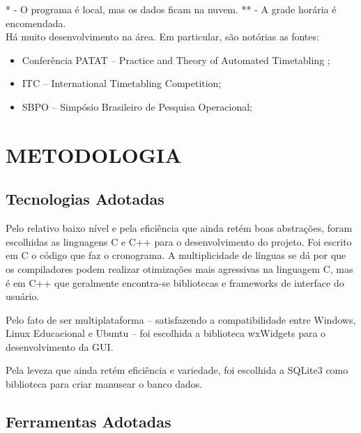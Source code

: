 \documentclass[12pt,a4paper]{article}
\begin{document}
		* - O programa é local, mas os dados ficam na nuvem.
		** - A grade horária é encomendada.
		\\

		Há muito desenvolvimento na área. Em particular, são notórias as fontes:

		\begin{itemize}
			\item Conferência PATAT -- Practice and Theory of Automated Timetabling ;
			\item ITC -- International Timetabling Competition;
			\item SBPO -- Simpósio Brasileiro de Pesquisa Operacional;
		\end{itemize}

	\clearpage

	\section{METODOLOGIA}

		\subsection{Tecnologias Adotadas}

			\par Pelo relativo baixo nível e pela eficiência que ainda retém boas abstrações, foram escolhidas as linguagens C e C++ para o desenvolvimento do projeto. Foi escrito em C o código que faz o cronograma. A multiplicidade de línguas se dá por que os compiladores podem realizar otimizações mais agressivas na linguagem C, mas é em C++ que geralmente encontra-se bibliotecas e frameworks de interface do usuário.

			\par Pelo fato de ser multiplataforma -- satisfazendo a compatibilidade entre Windows, Linux Educacional e Ubuntu -- foi escolhida a biblioteca wxWidgets para o desenvolvimento da GUI.

			\par Pela leveza que ainda retém eficiência e variedade, foi escolhida a SQLite3 como biblioteca para criar manusear o banco dados.

		\subsection{Ferramentas Adotadas}
\end{document}
